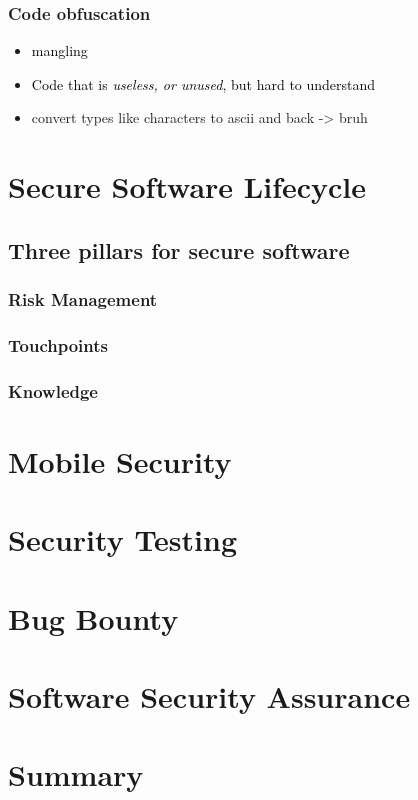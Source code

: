 \documentclass[main.tex,fontsize=8pt,paper=a4,paper=portrait,DIV=calc,]{scrartcl}
\begin{document}
\subsubsection{Code obfuscation}
\begin{itemize}
\item \textcolor{black}{mangling}
\item \textcolor{black}{Code that is \emph{useless, or unused}, but hard to understand}
\item convert types like characters to ascii and back -> bruh
\end{itemize} 


\section{Secure Software Lifecycle}

\subsection{Three pillars for secure software}
\subsubsection{Risk Management}


\subsubsection{Touchpoints}


\subsubsection{Knowledge}



\section{Mobile Security}

\section{Security Testing}

\section{Bug Bounty}

\section{Software Security Assurance}

\section{Summary}
\end{document}
